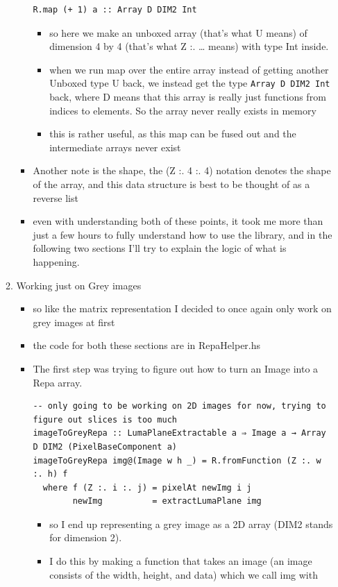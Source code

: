 \documentclass{article}
\begin{document}
\begin{enumerate}
\begin{enumerate}
\begin{itemize}
\begin{verbatim}
R.map (+ 1) a :: Array D DIM2 Int
\end{verbatim}
\begin{itemize}
\item so here we make an unboxed array (that's what U means) of dimension 4 by 4 (that's what
Z :. \ldots{} means) with type Int inside.
\item when we run map over the entire array instead of getting another
Unboxed type U back, we instead get the type \texttt{Array D DIM2 Int}
back, where D means that this array is really just functions from
indices to elements. So the array never really exists in memory
\item this is rather useful, as this map can be fused out and the
intermediate arrays never exist
\end{itemize}
\item Another note is the shape, the (Z :. 4 :. 4) notation denotes the
shape of the array, and this data structure is best to be thought of
as a reverse list
\item even with understanding both of these points, it took me more than
just a few hours to fully understand how to use the library, and in
the following two sections I'll try to explain the logic of what is happening.
\end{itemize}
\item Working just on Grey images
\label{sec-2-2-2}
\begin{itemize}
\item so like the matrix representation Ι decided to once again only work
on grey images at first
\item the code for both these sections are in RepaHelper.hs
\item The first step was trying to figure out how to turn an Image into a
Repa array.
\begin{verbatim}
-- only going to be working on 2D images for now, trying to figure out slices is too much
imageToGreyRepa :: LumaPlaneExtractable a ⇒ Image a → Array D DIM2 (PixelBaseComponent a)
imageToGreyRepa img@(Image w h _) = R.fromFunction (Z :. w :. h) f
  where f (Z :. i :. j) = pixelAt newImg i j
        newImg          = extractLumaPlane img
\end{verbatim}
\begin{itemize}
\item so I end up representing a grey image as a 2D array (DIM2 stands
for dimension 2).
\item I do this by making a function that takes an image (an image
consists of the width, height, and data) which we call img with

\end{itemize}
\end{itemize}
\end{enumerate}
\end{enumerate}
\end{document}
